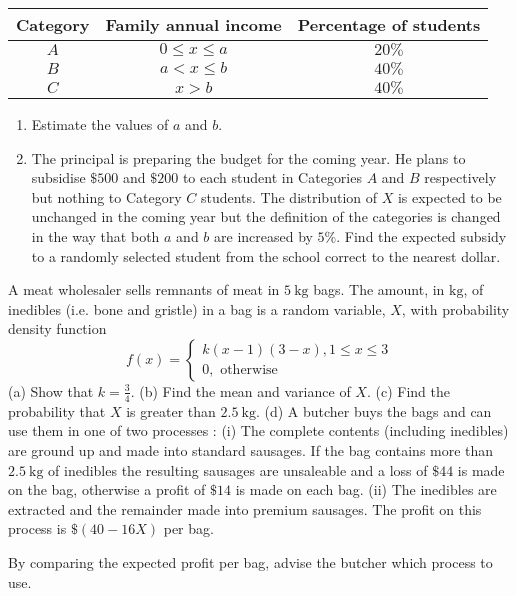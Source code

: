\documentclass[letterpaper,10pt,addpoints]{exam}
\begin{document}
\begin{questions}
\begin{enumerate}
  \begin{tabular}{|c|c|c|}
    \hline Category & Family annual income & Percentage of students \\
    \hline$A$ & $0 \leq x \leq a$ & $20 \%$ \\
    \hline$B$ & $a<x \leq b$ & $40 \%$ \\
    \hline$C$ & $x>b$ & $40 \%$ \\
    \hline
    \end{tabular}
    \begin{enumerate}
      \item Estimate the values of $a$ and $b$.
      \item The principal is preparing the budget for the coming year. He plans to subsidise $\$ 500$ and $\$ 200$ to each student in Categories $A$ and $B$ respectively but nothing to Category $C$ students. The distribution of $X$ is expected to be unchanged in the coming year but the definition of the categories is changed in the way that both $a$ and $b$ are increased by $5 \%$. Find the expected subsidy to a randomly selected student from the school correct to the nearest dollar.
    \end{enumerate}
        
\end{enumerate}

\question
A meat wholesaler sells remnants of meat in $5 \mathrm{~kg}$ bags. The amount, in $\mathrm{kg}$, of inedibles (i.e. bone and gristle) in a bag is a random variable, $X$, with probability density function
$$
f(x)=\left\{\begin{array}{l}
k(x-1)(3-x), 1 \leq x \leq 3 \\
0, \text { otherwise }
\end{array}\right.
$$
(a) Show that $k=\frac{3}{4}$.
(b) Find the mean and variance of $X$.
(c) Find the probability that $X$ is greater than $2.5 \mathrm{~kg}$.
(d) A butcher buys the bags and can use them in one of two processes :
(i) The complete contents (including inedibles) are ground up and made into standard sausages. If the bag contains more than $2.5 \mathrm{~kg}$ of inedibles the resulting sausages are unsaleable and a loss of $\$ 44$ is made on the bag, otherwise a profit of $\$ 14$ is made on each bag.
(ii) The inedibles are extracted and the remainder made into premium sausages. The profit on this process is $\$(40-16 X)$ per bag.

By comparing the expected profit per bag, advise the butcher which process to use.





\end{questions}
\end{document}

